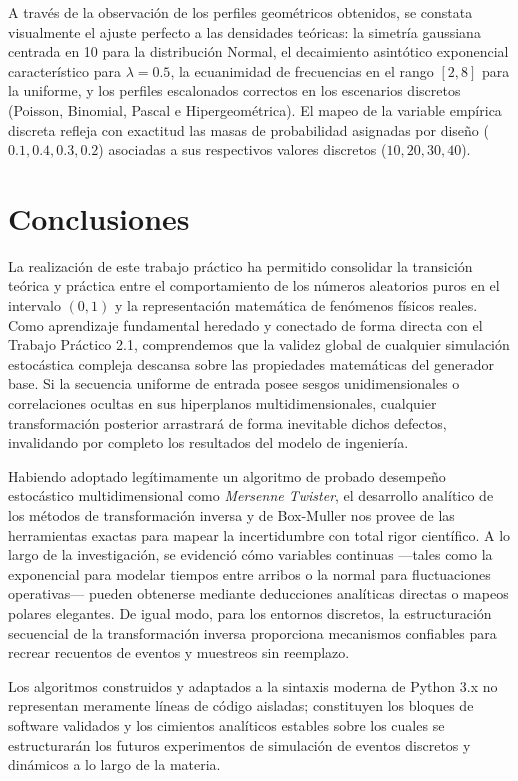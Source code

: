\documentclass{article}
\begin{document}
A través de la observación de los perfiles geométricos obtenidos, se constata visualmente el ajuste perfecto a las densidades teóricas: la simetría gaussiana centrada en 10 para la distribución Normal, el decaimiento asintótico exponencial característico para $\lambda = 0.5$, la ecuanimidad de frecuencias en el rango $[2,8]$ para la uniforme, y los perfiles escalonados correctos en los escenarios discretos (Poisson, Binomial, Pascal e Hipergeométrica). El mapeo de la variable empírica discreta refleja con exactitud las masas de probabilidad asignadas por diseño ($0.1, 0.4, 0.3, 0.2$) asociadas a sus respectivos valores discretos ($10, 20, 30, 40$).

\newpage
\section{Conclusiones}

La realización de este trabajo práctico ha permitido consolidar la transición teórica y práctica entre el comportamiento de los números aleatorios puros en el intervalo $(0,1)$ y la representación matemática de fenómenos físicos reales. Como aprendizaje fundamental heredado y conectado de forma directa con el Trabajo Práctico 2.1, comprendemos que la validez global de cualquier simulación estocástica compleja descansa sobre las propiedades matemáticas del generador base. Si la secuencia uniforme de entrada posee sesgos unidimensionales o correlaciones ocultas en sus hiperplanos multidimensionales, cualquier transformación posterior arrastrará de forma inevitable dichos defectos, invalidando por completo los resultados del modelo de ingeniería.

Habiendo adoptado legítimamente un algoritmo de probado desempeño estocástico multidimensional como \textit{Mersenne Twister}, el desarrollo analítico de los métodos de transformación inversa y de Box-Muller nos provee de las herramientas exactas para mapear la incertidumbre con total rigor científico. A lo largo de la investigación, se evidenció cómo variables continuas —tales como la exponencial para modelar tiempos entre arribos o la normal para fluctuaciones operativas— pueden obtenerse mediante deducciones analíticas directas o mapeos polares elegantes. De igual modo, para los entornos discretos, la estructuración secuencial de la transformación inversa proporciona mecanismos confiables para recrear recuentos de eventos y muestreos sin reemplazo.

Los algoritmos construidos y adaptados a la sintaxis moderna de Python 3.x no representan meramente líneas de código aisladas; constituyen los bloques de software validados y los cimientos analíticos estables sobre los cuales se estructurarán los futuros experimentos de simulación de eventos discretos y dinámicos a lo largo de la materia.
\end{document}
